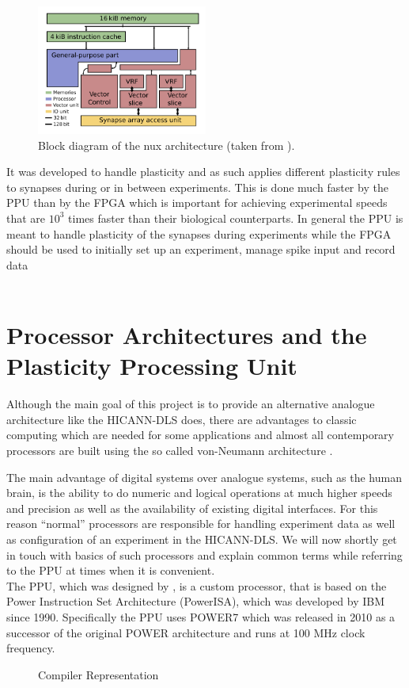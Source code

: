 \begin{figure}
    \centering
    \includegraphics[width=0.5\textwidth]{pictures/nux.png}
    \caption{\label{fig:nux} Block diagram of the nux architecture (taken from \cite{PPU}).}
\end{figure}
It was developed to handle plasticity and as such applies different plasticity rules to synapses during or in between experiments.
This is done much faster by the \ac{PPU} than by the \ac{FPGA} which is important for achieving experimental speeds that are $10^{3}$ times faster than their biological counterparts.
In general the \ac{PPU} is meant to handle plasticity of the synapses during experiments while the \ac{FPGA} should be used to initially set up an experiment, manage spike input and record data 
\\
\\
\section{Processor Architectures and the Plasticity Processing Unit}
Although the main goal of this project is to provide an alternative analogue architecture like the \ac{HICANN-DLS} does, there are advantages to classic computing which are needed for some applications and almost all contemporary processors are built using the so called von-Neumann architecture .

The main advantage of digital systems over analogue systems, such as the human brain, is the ability to do numeric and logical operations at much higher speeds and precision as well as the availability of existing digital interfaces.
For this reason ``normal'' processors are responsible for handling experiment data as well as configuration of an experiment in the \ac{HICANN-DLS}.
We will now shortly get in touch with basics of such processors and explain common terms while referring to the \ac{PPU} at times when it is convenient.
\\
The \ac{PPU}, which was designed by \citep{PPU}, is a custom processor, that is based on the Power Instruction Set Architecture (PowerISA), which was developed by IBM since 1990. 
Specifically the \ac{PPU} uses POWER7 which was released in 2010 as a successor of the original POWER architecture and runs at 100 MHz clock frequency.
\\
\begin{figure}
    \centering
        
        \caption{\label{fig:processor} Compiler Representation}
\end{figure}

